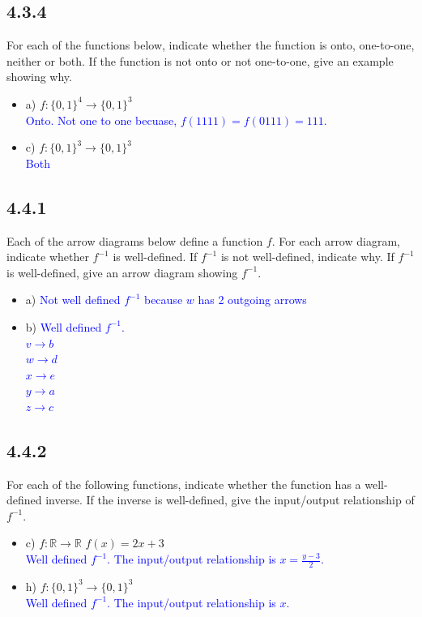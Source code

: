 \documentclass{article}
\begin{document}
\subsection*{4.3.4}
For each of the functions below, indicate whether the function is onto, one-to-one, neither or both. If the function is not onto or not one-to-one, give an example showing why.
\begin{itemize}
    \item a) $f: \{0,1\}^4 \rightarrow \{0,1\}^3$ \\
    \textcolor{blue}{Onto. Not one to one becuase, $f(1111) = f(0111) = 111$.}
    \item c) $f: \{0,1\}^3 \rightarrow \{0,1\}^3$ \\
    \textcolor{blue}{Both}
\end{itemize}

\subsection*{4.4.1}
Each of the arrow diagrams below define a function $f$. For each arrow diagram, indicate whether $f^{-1}$ is well-defined. If $f^{-1}$ is not well-defined, indicate why. If $f^{-1}$ is well-defined, give an arrow diagram showing $f^{-1}$.
\begin{itemize}
    \item a) \textcolor{blue}{Not well defined $f^{-1}$ because $w$ has 2 outgoing arrows}
    \item b) \textcolor{blue}{Well defined $f^{-1}$.} \\
    \textcolor{blue}{$v \rightarrow b$} \\
    \textcolor{blue}{$w \rightarrow d$} \\
    \textcolor{blue}{$x \rightarrow e$} \\
    \textcolor{blue}{$y \rightarrow a$} \\
    \textcolor{blue}{$z \rightarrow c$}
\end{itemize}

\subsection*{4.4.2}
For each of the following functions, indicate whether the function has a well-defined inverse. If the inverse is well-defined, give the input/output relationship of $f^{-1}$.
\begin{itemize}
    \item c) $f: \mathbb{R} \rightarrow \mathbb{R}$ $f(x) = 2x + 3$ \\
    \textcolor{blue}{Well defined $f^{-1}$. The input/output relationship is $x = \frac{y-3}{2}$.}
    \item h) $f: \{0,1\}^3 \rightarrow \{0,1\}^3$ \\
    \textcolor{blue}{Well defined $f^{-1}$. The input/output relationship is $x$.}
\end{itemize}
\end{document}
